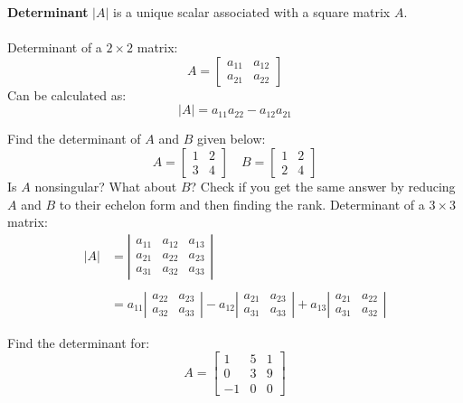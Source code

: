 \documentclass{./../../Latex/handout}
\begin{document}
\thispagestyle{plain}


 \textbf{Determinant} $|A|$ is a unique scalar associated with a {square} matrix $A$. \\~\\
 Determinant of a $2 \times 2$ matrix:
 $$ A=\left[\begin{array}{ll}a_{11} & a_{12} \\ a_{21} & a_{22}\end{array}\right] $$
 Can be calculated as:
 $$ |A|=a_{11} a_{22}-a_{12} a_{21} $$  
\vspace{2em}

Find the determinant of $A$ and $B$ given below: $$A=\left[\begin{array}{ll}
1 & 2 \\
3 & 4
\end{array}\right]
\quad
B=\left[\begin{array}{ll}
1 & 2 \\
2 & 4
\end{array}\right]
$$
Is $A$ nonsingular? What about $B$? Check if you get the same answer by reducing $A$ and $B$ to their echelon form and then finding the rank. 
\newpage
 Determinant of a $3 \times 3$ matrix:
$$
\begin{aligned}
|A| &=\left|\begin{array}{lll}
a_{11} & a_{12} & a_{13} \\
a_{21} & a_{22} & a_{23} \\
a_{31} & a_{32} & a_{33}
\end{array}\right| \\~\\
&=a_{11}\left|\begin{array}{ll}
a_{22} & a_{23} \\
a_{32} & a_{33}
\end{array}\right|-a_{12}\left|\begin{array}{ll}
a_{21} & a_{23} \\
a_{31} & a_{33}
\end{array}\right| 
+a_{13}\left|\begin{array}{ll}
a_{21} & a_{22} \\
a_{31} & a_{32}
\end{array}\right|
\end{aligned}
$$

\vspace{1em}
Find the determinant for:
\[
A=\left[\begin{array}{ccc}
1 & 5 & 1 \\
0 & 3 & 9 \\
-1 & 0 & 0
\end{array}\right]
\]
\end{document}
